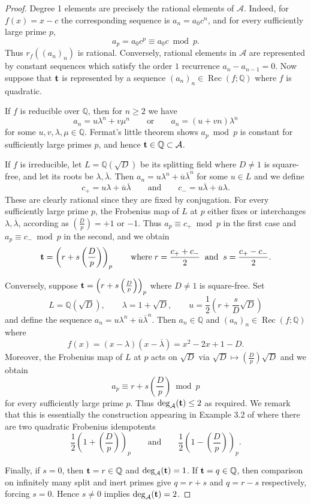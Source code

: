 \documentclass[12pt,reqno]{amsart}
\theoremstyle{remark}
\newcommand{\cA}{\mathcal A}
\newcommand{\leg}[2]{\left(\frac{#1}{#2}\right)}
\DeclareMathOperator{\Rec}{Rec}
\begin{document}
\begin{proof}
Degree 1 elements are precisely the rational elements of $\cA$. Indeed, for $f(x)=x-c$ the corresponding sequence is $a_n=a_0c^n$, and for every sufficiently large prime $p$,
\[a_p=a_0c^p\equiv a_0c\bmod p.\]
Thus $r_f((a_n)_n)$ is rational. Conversely, rational elements in $\cA$ are represented by constant sequences which satisfy the order $1$ recurrence $a_n-a_{n-1}=0$. 
Now suppose that ${\bf t}$ is represented by a sequence $(a_n)_n\in\Rec(f;\mathbb{Q})$ where $f$ is quadratic. 
\smallskip

If $f$ is reducible over $\mathbb{Q}$, then for $n\geq 2$ we have
\[a_n=u\lambda^n+v\mu^n\qquad\text{or}\qquad a_n=(u+vn)\lambda^n\]
for some $u,v,\lambda,\mu\in\mathbb{Q}$. Fermat's little theorem shows $a_p\bmod p$ is constant for sufficiently large primes $p$, and hence ${\bf t}\in\mathbb{Q}\subset\cA$.
\smallskip

If $f$ is irreducible, let $L=\mathbb{Q}(\sqrt{D})$ be its splitting field where $D\neq 1$ is square-free, and let its roots be $\lambda,\overline{\lambda}$. 
Then $a_n=u\lambda^n+\overline{u}\overline{\lambda}^n$ for some $u\in L$ and we define
\[c_+=u\lambda+\overline{u}{\overline{\lambda}}\qquad\text{and}\qquad
c_-=u\overline{\lambda}+\overline{u}\lambda.\]
These are clearly rational since they are fixed by conjugation. 
For every sufficiently large prime $p$, the Frobenius map of $L$ at $p$ either fixes or interchanges $\lambda,\overline{\lambda}$, according as $\leg{D}{p}=+1$ or $-1$. 
Thus $a_p\equiv c_+\bmod p$ in the first case and $a_p\equiv c_-\bmod p$ in the second, and we obtain 
\[{\bf t}=\left(r+s\leg{D}{p}\right)_p\qquad\text{where}\; 
r=\frac{c_++c_-}{2}\;\;\text{and}\;\; s=\frac{c_+-c_-}{2}.\]

Conversely, suppose ${\bf t}=\left(r+s\left(\frac{D}{p}\right)\right)_p$ where $D\neq 1$ is square-free. Set 
\[L=\mathbb{Q}(\sqrt{D}),\qquad\lambda=1+\sqrt{D},\qquad u=\frac{1}{2}\left(r+\frac{s}{D}\sqrt{D}\right)\] 
and define the sequence $a_n=u\lambda^n+\overline{u}\overline{\lambda}^n$.
Then $a_n\in\mathbb{Q}$ and $(a_n)_n\in\Rec(f;\mathbb{Q})$ where
\[f(x)=(x-\lambda)(x-\overline{\lambda})=x^2-2x+1-D.\]
Moreover, the Frobenius map of $L$ at $p$ acts on $\sqrt{D}$ via
$\sqrt{D}\mapsto\leg{D}{p}\sqrt{D}$ 
and we obtain 
\[a_p\equiv r+s\leg{D}{p}\bmod p\]
for every sufficiently large prime $p$. Thus $\deg_\cA({\bf t})\leq 2$ as required. 
We remark that this is essentially the construction appearing in Example 3.2 of \cite{RTTY24} where there are two quadratic Frobenius idempotents
\[\frac{1}{2}\left(1+\leg{D}{p}\right)_p\qquad\text{and}\qquad
\frac{1}{2}\left(1-\leg{D}{p}\right)_p.\]

Finally, if $s=0$, then ${\bf t}=r\in\mathbb{Q}$ and $\deg_\cA({\bf t})=1$. 
If ${\bf t}=q\in\mathbb{Q}$, then comparison on infinitely many split and inert primes give $q=r+s$ and $q=r-s$ respectively, forcing $s=0$. 
Hence $s\neq 0$ implies $\deg_\cA({\bf t})=2$.
\end{proof}
\end{document}
